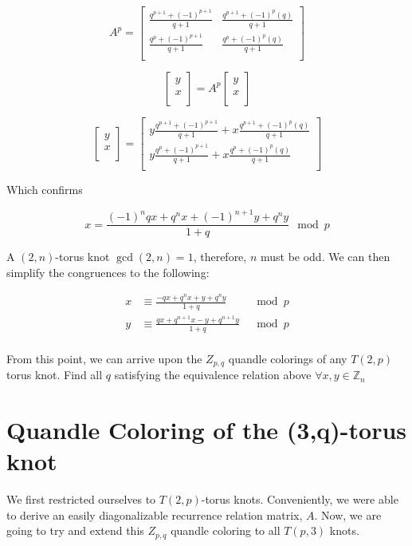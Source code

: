 \documentclass[paper.tex]{subfiles}
\begin{document}
\[
A^{p}=
\left[ \begin{array}{ccc}
\frac{q^{p+1} + (-1)^{p+1}}{q+1} & \frac{q^{p+1} + (-1)^{p}(q)}{q+1} \\
\frac{q^{p} + (-1)^{p+1}}{q+1} & \frac{q^{p} + (-1)^{p}(q)}{q+1} \\
\end{array} \right]
\]

\[
\left[ \begin{array}{ccc}
y \\
x \\
\end{array} \right]=
A^{p}
\left[ \begin{array}{ccc}
y \\
x \\
\end{array} \right]
\]

\[
\left[ \begin{array}{ccc}
y \\
x \\
\end{array} \right]=
\left[ \begin{array}{ccc}
y \frac{q^{p+1} + (-1)^{p+1}}{q+1} + x \frac{q^{p+1} + (-1)^{p}(q)}{q+1} \\
y \frac{q^{p} + (-1)^{p+1}}{q+1} + x \frac{q^{p} + (-1)^{p}(q)}{q+1} \\
\end{array} \right]
\]

Which confirms

$$x = \frac{(-1)^nqx+q^nx+(-1)^{n+1}y+q^ny}{1+q} \mod p $$

A $(2,n)$-torus knot $\gcd(2,n) = 1$, therefore, $n$ must be odd. We can then simplify the congruences to the following:

\begin{align*}
	x &\equiv \frac{-qx+q^nx+y+q^ny}{1+q} & \mod{p} \\
	y &\equiv \frac{qx+q^{n+1}x-y+q^{n+1}y}{1+q} & \mod{p} \\
\end{align*}

From this point, we can arrive upon the $Z_{p,q}$ quandle colorings of any $T(2, p)$ torus knot. Find all $q$ satisfying the equivalence relation above $\forall x,y \in \mathbb{Z}_n$

\section{Quandle Coloring of the (3,q)-torus knot}\label{sec:3ntorus}
We first restricted ourselves to $T(2,p)$-torus knots. Conveniently, we were able to derive an easily diagonalizable recurrence relation matrix, $A$. Now, we are going to try and extend this $Z_{p,q}$ quandle coloring to all $T(p,3)$ knots.
\end{document}

